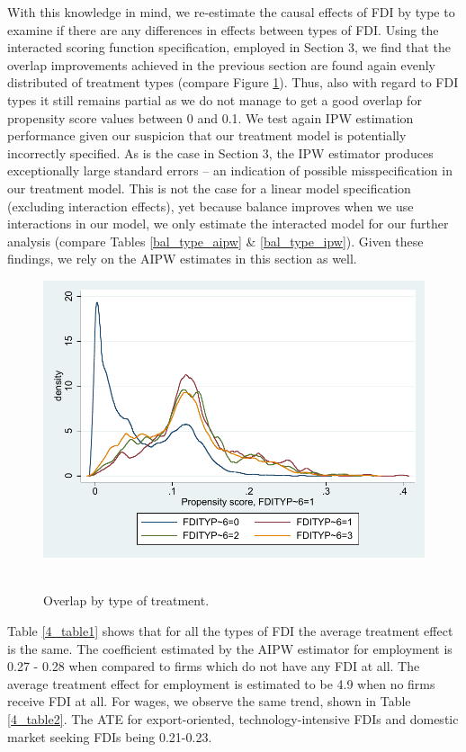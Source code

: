With this knowledge in mind, we re-estimate the causal effects of FDI by type to examine if there are any differences in effects between types of FDI. Using the interacted scoring function specification, employed in Section 3, we find that the overlap improvements achieved in the previous section are found again evenly distributed of treatment types (compare Figure \ref{ol_aipw_type}). Thus, also with regard to FDI types it still remains partial as we do not manage to get a good overlap for propensity score values between 0 and 0.1. We test again IPW estimation performance given our suspicion that our treatment model is potentially incorrectly specified. As is the case in Section 3, the IPW estimator produces exceptionally large standard errors – an indication of possible misspecification in our treatment model. This is not the case for a linear model specification (excluding interaction effects), yet because balance improves when we use interactions in our model, we only estimate the interacted model for our further analysis (compare Tables \ref{bal_type_aipw} \& \ref{bal_type_ipw}). Given these findings, we rely on the AIPW estimates in this section as well.  

\begin{figure}
	\centering
	\includegraphics[scale=0.6]{figures_and_tables/4_overlap_aipw_typeFDI.pdf}\
	\caption{Overlap by type of treatment.}
	\label{ol_aipw_type}
\end{figure}





Table \ref{4_table1} shows that for all the types of FDI the average treatment effect is the same. The coefficient estimated by the AIPW estimator for employment is 0.27 - 0.28 when compared to firms which do not have any FDI at all. The average treatment effect for employment is estimated to be 4.9 when no firms receive FDI at all. For wages, we observe the same trend, shown in Table \ref{4_table2}. The ATE for export-oriented, technology-intensive FDIs and domestic market seeking FDIs being 0.21-0.23. 

